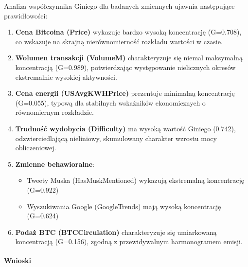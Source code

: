 \documentclass[
  11pt,
]{article}
\providecommand{\tightlist}{%
  \setlength{\itemsep}{0pt}\setlength{\parskip}{0pt}}
\begin{document}
Analiza współczynnika Giniego dla badanych zmiennych ujawnia następujące
prawidłowości:

\begin{enumerate}
\def\labelenumi{\arabic{enumi}.}
\item
  \textbf{Cena Bitcoina (Price)} wykazuje bardzo wysoką koncentrację
  (G=0.708), co wskazuje na skrajną nierównomierność rozkładu wartości w
  czasie.
\item
  \textbf{Wolumen transakcji (VolumeM)} charakteryzuje się niemal
  maksymalną koncentracją (G=0.989), potwierdzając występowanie
  nielicznych okresów ekstremalnie wysokiej aktywności.
\item
  \textbf{Cena energii (USAvgKWHPrice)} prezentuje minimalną
  koncentrację (G=0.055), typową dla stabilnych wskaźników ekonomicznych
  o równomiernym rozkładzie.
\item
  \textbf{Trudność wydobycia (Difficulty)} ma wysoką wartość Giniego
  (0.742), odzwierciedlającą nieliniowy, skumulowany charakter wzrostu
  mocy obliczeniowej.
\item
  \textbf{Zmienne behawioralne}:

  \begin{itemize}
  \tightlist
  \item
    Tweety Muska (HasMuskMentioned) wykazują ekstremalną koncentrację
    (G=0.922)
  \item
    Wyszukiwania Google (GoogleTrends) mają wysoką koncentrację
    (G=0.624)
  \end{itemize}
\item
  \textbf{Podaż BTC (BTCCirculation)} charakteryzuje się umiarkowaną
  koncentracją (G=0.156), zgodną z przewidywalnym harmonogramem emisji.
\end{enumerate}

\paragraph{Wnioski}\label{wnioski-8}
\end{document}
